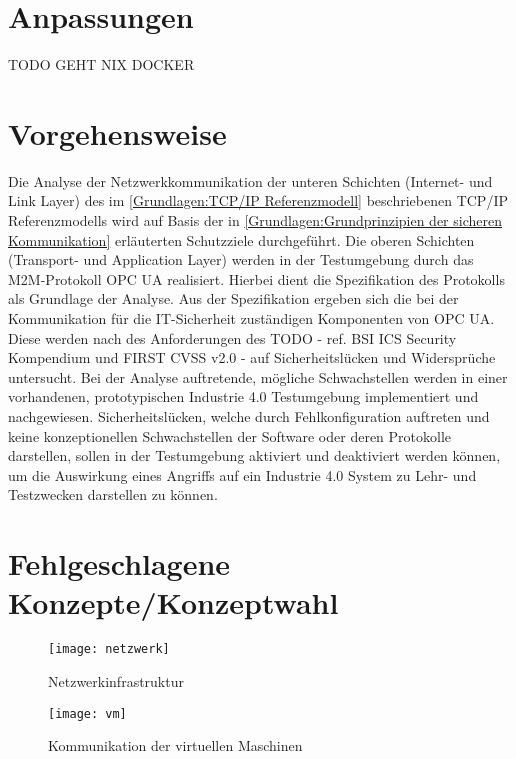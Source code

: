 \section{Anpassungen}
\label{Konzept:Anpassungen}
TODO GEHT NIX DOCKER

\section{Vorgehensweise}
Die Analyse der Netzwerkkommunikation der unteren Schichten (Internet- und Link Layer) des im \autoref{Grundlagen:TCP/IP Referenzmodell} beschriebenen TCP/IP Referenzmodells wird auf Basis der in \autoref{Grundlagen:Grundprinzipien der sicheren Kommunikation} erläuterten Schutzziele durchgeführt. Die oberen Schichten (Transport- und Application Layer) werden in der Testumgebung durch das \ac{M2M}-Protokoll \ac{OPC UA} realisiert. Hierbei dient die Spezifikation des Protokolls als Grundlage der Analyse. Aus der Spezifikation ergeben sich die bei der Kommunikation für die IT-Sicherheit zuständigen Komponenten von \ac{OPC UA}. Diese werden nach des Anforderungen des TODO - ref. BSI ICS Security Kompendium und FIRST CVSS v2.0 - auf Sicherheitslücken und Widersprüche untersucht. Bei der Analyse auftretende, mögliche Schwachstellen werden in einer vorhandenen, prototypischen Industrie 4.0 Testumgebung \cite{Weber2018} implementiert und nachgewiesen. Sicherheitslücken, welche durch Fehlkonfiguration auftreten und keine konzeptionellen Schwachstellen der Software oder deren Protokolle darstellen, sollen in der Testumgebung aktiviert und deaktiviert werden können, um die Auswirkung eines Angriffs auf ein Industrie 4.0 System zu Lehr- und Testzwecken darstellen zu können.

\section{Fehlgeschlagene Konzepte/Konzeptwahl}

\begin{figure}[h]
    \centering
    \texttt{[image: netzwerk]}
    \caption{Netzwerkinfrastruktur} 
    \label{Konzept:Netzwerkkonzept}
  \end{figure}
  
  \clearpage

  \begin{figure}[h]
    \centering
    \texttt{[image: vm]}
    \caption{Kommunikation der virtuellen Maschinen} 
    \label{Konzept:VMKommunikation}
  \end{figure}
  
  \clearpage